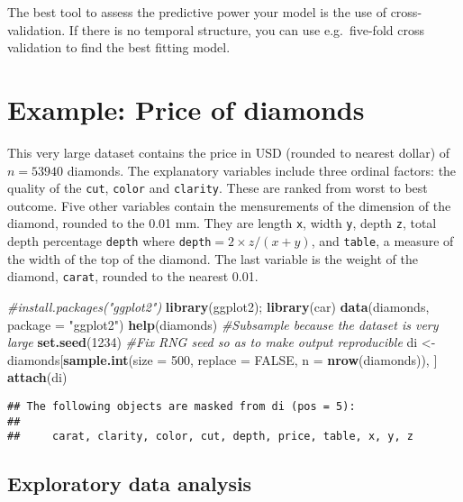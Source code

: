 \documentclass[]{book}
\newenvironment{Shaded}{\begin{snugshade}}{\end{snugshade}}
\newcommand{\CommentTok}[1]{\textcolor[rgb]{0.56,0.35,0.01}{\textit{#1}}}
\newcommand{\DataTypeTok}[1]{\textcolor[rgb]{0.13,0.29,0.53}{#1}}
\newcommand{\DecValTok}[1]{\textcolor[rgb]{0.00,0.00,0.81}{#1}}
\newcommand{\KeywordTok}[1]{\textcolor[rgb]{0.13,0.29,0.53}{\textbf{#1}}}
\newcommand{\NormalTok}[1]{#1}
\newcommand{\OtherTok}[1]{\textcolor[rgb]{0.56,0.35,0.01}{#1}}
\newcommand{\StringTok}[1]{\textcolor[rgb]{0.31,0.60,0.02}{#1}}
\theoremstyle{definition}
\theoremstyle{definition}
\theoremstyle{definition}
\theoremstyle{remark}
\begin{document}
The best tool to assess the predictive power your model is the use of
cross-validation. If there is no temporal structure, you can use
e.g.~five-fold cross validation to find the best fitting model.

\hypertarget{example-price-of-diamonds}{%
\section{Example: Price of diamonds}\label{example-price-of-diamonds}}

This very large dataset contains the price in USD (rounded to nearest
dollar) of \(n=53940\) diamonds. The explanatory variables include three
ordinal factors: the quality of the \texttt{cut}, \texttt{color} and
\texttt{clarity}. These are ranked from worst to best outcome. Five
other variables contain the mensurements of the dimension of the
diamond, rounded to the 0.01 mm. They are length \texttt{x}, width
\texttt{y}, depth \texttt{z}, total depth percentage \texttt{depth}
where \texttt{depth}\(=2\times z/(x + y)\), and \texttt{table}, a
measure of the width of the top of the diamond. The last variable is the
weight of the diamond, \texttt{carat}, rounded to the nearest 0.01.

\begin{Shaded}
\begin{Highlighting}[]
\CommentTok{#install.packages("ggplot2")}
\KeywordTok{library}\NormalTok{(ggplot2); }\KeywordTok{library}\NormalTok{(car)}
\KeywordTok{data}\NormalTok{(diamonds, }\DataTypeTok{package =} \StringTok{"ggplot2"}\NormalTok{)}
\KeywordTok{help}\NormalTok{(diamonds)}
\CommentTok{#Subsample because the dataset is very large}
\KeywordTok{set.seed}\NormalTok{(}\DecValTok{1234}\NormalTok{) }\CommentTok{#Fix RNG seed so as to make output reproducible}
\NormalTok{di <-}\StringTok{ }\NormalTok{diamonds[}\KeywordTok{sample.int}\NormalTok{(}\DataTypeTok{size =} \DecValTok{500}\NormalTok{, }\DataTypeTok{replace =} \OtherTok{FALSE}\NormalTok{, }\DataTypeTok{n =} \KeywordTok{nrow}\NormalTok{(diamonds)), ]}
\KeywordTok{attach}\NormalTok{(di)}
\end{Highlighting}
\end{Shaded}

\begin{verbatim}
## The following objects are masked from di (pos = 5):
## 
##     carat, clarity, color, cut, depth, price, table, x, y, z
\end{verbatim}

\hypertarget{exploratory-data-analysis}{%
\subsection{Exploratory data analysis}\label{exploratory-data-analysis}}
\end{document}
